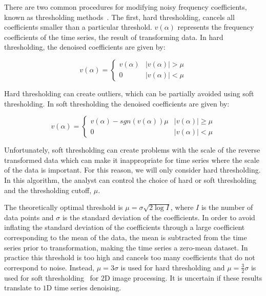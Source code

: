 \documentclass[11pt]{article}
\theoremstyle{definition}
\begin{document}
There are two common procedures for modifying noisy frequency
coefficients, known as thresholding methods~\cite{Donoho94}. The
first, hard thresholding, cancels all coefficients smaller than a
particular threshold. $v\left(\alpha\right)$ represents the frequency
coefficients of the time series, the result of transforming data. In
hard thresholding, the denoised coefficients are given by:

\begin{displaymath}
v\left(\alpha\right) = 
\begin{cases}
v\left(\alpha\right) & \lvert v\left(\alpha\right)\rvert > \mu \\
0 & \lvert v\left(\alpha\right)\rvert < \mu
\end{cases}
\end{displaymath}

Hard thresholding can create outliers, which can be partially avoided
using soft thresholding. In soft thresholding the denoised
coefficients are given by:

\begin{displaymath}
v\left(\alpha\right) = 
\begin{cases}
v\left(\alpha\right) - sgn\left(v\left(\alpha\right)\right)\mu & \lvert v\left(\alpha\right)\rvert \geq \mu \\
0 & \lvert v\left(\alpha\right)\rvert < \mu
\end{cases}
\end{displaymath}

Unfortunately, soft thresholding can create problems with the scale of
the reverse transformed data which can make it inappropriate for time
series where the scale of the data is important. For this reason, we
will only consider hard thresholding. In this algorithm, the analyst
can control the choice of hard or soft thresholding and the
thresholding cutoff, $\mu$.

The theoretically optimal threshold is $\mu = \sigma \sqrt{2 \log I}$,
where $I$ is the number of data points and $\sigma$ is the standard
deviation of the coefficients. In order to avoid inflating the
standard deviation of the coefficients through a large coefficient
corresponding to the mean of the data, the mean is subtracted from the
time series prior to transformation, making the time series a
zero-mean dataset. In practice this threshold is too high and cancels
too many coefficients that do not correspond to noise. Instead, $\mu =
3 \sigma$ is used for hard thresholding and $\mu = \frac{3}{2} \sigma$
is used for soft thresholding~\cite{Buades05} for $2$D image
processing. It is uncertain if these results translate to $1$D time
series denoising.
\end{document}
